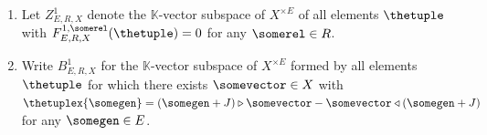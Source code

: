 \documentclass[10pt,a4paper]{amsart}
\numberwithin{equation}{section}
\newcommand{\HSuacocycles}[4]{Z^{#1}_{#2,#3,#4}}
\newcommand{\HSuacoboundaries}[4]{B^{#1}_{#2,#3,#4}}
\newcommand{\HSuafuncxx}[6]{F^{#1,#5}_{#2,#3,#4}(#6)}
\newcommand{\Sdirectproduct}{\times}
\newcommand{\Sleftmoduleaction}{\triangleright}
\newcommand{\Srightmoduleaction}{\triangleleft}
\newcommand{\thegens}{E}
\newcommand{\therels}{R}
\newcommand{\theideal}{J}
\newcommand{\thefield}{\mathbb{K}}
\newcommand{\themodule}{X}
\begin{document}
{{  \begin{Definition}\quad
    \begin{enumerate}
  \item Let $\HSuacocycles{1}{\thegens}{\therels}{\themodule}$ denote the $\thefield$-vector subspace of $\themodule^{\Sdirectproduct \thegens}$ of all elements $\thetuple$ with $\HSuafuncxx{1}{\thegens}{\therels}{\themodule}{\somerel}{\thetuple}=0$ for any $\somerel\in\therels$.
    \item Write $\HSuacoboundaries{1}{\thegens}{\therels}{\themodule}$ for the $\thefield$-vector subspace of $\themodule^{\Sdirectproduct \thegens}$ formed by all elements $\thetuple$ for which there exists $\somevector\in\themodule$ with $\thetuplex{\somegen}=(\somegen+\theideal)\Sleftmoduleaction\somevector-\somevector\Srightmoduleaction(\somegen+\theideal)$ for any $\somegen\in\thegens$.
    \end{enumerate}
  \end{Definition}
}

}
\end{document}
